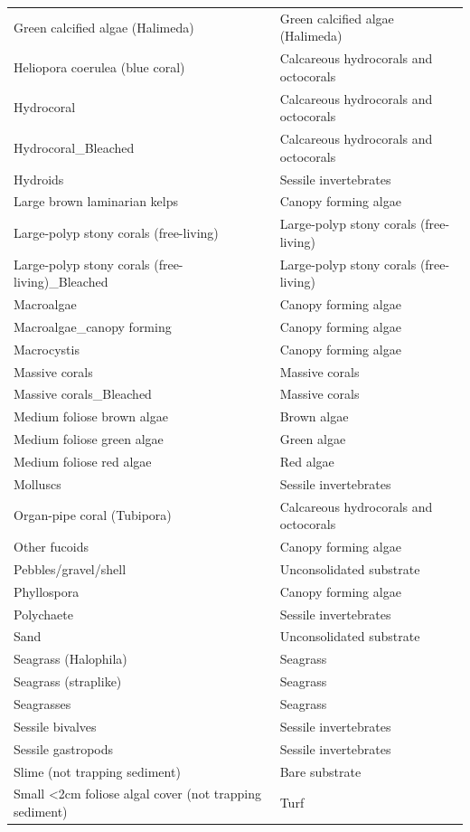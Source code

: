 \begin{longtable}[]{@{}
  >{\raggedright\arraybackslash}p{}
  >{\raggedright\arraybackslash}p{}@{}}
Green calcified algae (Halimeda) & Green calcified algae (Halimeda) \\
Heliopora coerulea (blue coral) & Calcareous hydrocorals and
octocorals \\
Hydrocoral & Calcareous hydrocorals and octocorals \\
Hydrocoral\_Bleached & Calcareous hydrocorals and octocorals \\
Hydroids & Sessile invertebrates \\
Large brown laminarian kelps & Canopy forming algae \\
Large-polyp stony corals (free-living) & Large-polyp stony corals
(free-living) \\
Large-polyp stony corals (free-living)\_Bleached & Large-polyp stony
corals (free-living) \\
Macroalgae & Canopy forming algae \\
Macroalgae\_canopy forming & Canopy forming algae \\
Macrocystis & Canopy forming algae \\
Massive corals & Massive corals \\
Massive corals\_Bleached & Massive corals \\
Medium foliose brown algae & Brown algae \\
Medium foliose green algae & Green algae \\
Medium foliose red algae & Red algae \\
Molluscs & Sessile invertebrates \\
Organ-pipe coral (Tubipora) & Calcareous hydrocorals and octocorals \\
Other fucoids & Canopy forming algae \\
Pebbles/gravel/shell & Unconsolidated substrate \\
Phyllospora & Canopy forming algae \\
Polychaete & Sessile invertebrates \\
Sand & Unconsolidated substrate \\
Seagrass (Halophila) & Seagrass \\
Seagrass (straplike) & Seagrass \\
Seagrasses & Seagrass \\
Sessile bivalves & Sessile invertebrates \\
Sessile gastropods & Sessile invertebrates \\
Slime (not trapping sediment) & Bare substrate \\
Small \textless2cm foliose algal cover (not trapping sediment) & Turf \\

\end{longtable}
